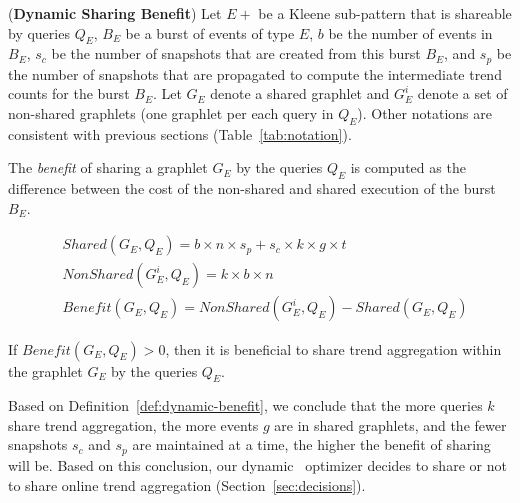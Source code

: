 
\begin{definition}(\textbf{Dynamic Sharing Benefit})
%
Let $E+$ be a Kleene sub-pattern that is shareable by queries $Q_E$,
$B_E$ be a burst of events of type $E$,
$b$ be the number of events in $B_E$,
$s_c$ be the number of snapshots that are created from this burst $B_E$, and
$s_p$ be the number of snapshots that are propagated to compute the intermediate trend counts for the burst $B_E$. 
Let $G_E$ denote a shared graphlet and $G_E^i$ denote a set of non-shared graphlets (one graphlet per each query in $Q_E$).
Other notations are consistent with previous sections (Table~\ref{tab:notation}).

The \textit{benefit} of sharing a graphlet $G_E$ by the queries $Q_E$ is computed as the difference between the cost of the non-shared and shared execution of the burst $B_E$.

\vspace{-4mm}
\begin{align}
&\mathit{Shared}(G_E,Q_E) 
= b \times n \times s_p
+ s_c \times k \times g \times t
\nonumber\\
&\mathit{NonShared}(G_E^i,Q_E) 
= k \times b \times n
\nonumber\\
&\mathit{Benefit}(G_E,Q_E) 
= \mathit{NonShared}(G_E^i,Q_E)
- \mathit{Shared}(G_E,Q_E)
\label{eq:dynamic-benefit}
\end{align}

If $\mathit{Benefit}(G_E,Q_E)>0$, then it is beneficial to share trend aggregation within the graphlet $G_E$ by the queries $Q_E$.
%
\label{def:dynamic-benefit}
\end{definition}

Based on Definition~\ref{def:dynamic-benefit}, we conclude that the more queries $k$ share trend aggregation, the more events $g$ are in shared graphlets, and the fewer snapshots $s_c$ and $s_p$ are maintained at a time, the higher the benefit of sharing will be. Based on this conclusion, our dynamic \app\ optimizer decides to share or not to share online trend aggregation (Section~\ref{sec:decisions}).




